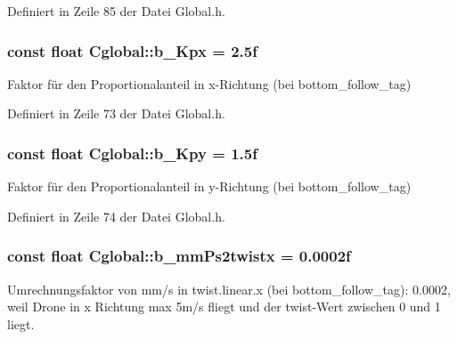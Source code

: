 Definiert in Zeile 85 der Datei Global.h.

\hypertarget{class_cglobal_ac4453024370993d15408d4a3235e95e8}{
\subsubsection[{b\_\-Kpx}]{\setlength{\rightskip}{0pt plus 5cm}const float {\bf Cglobal::b\_\-Kpx} = 2.5f}}
\label{class_cglobal_ac4453024370993d15408d4a3235e95e8}


Faktor für den Proportionalanteil in x-\/Richtung (bei bottom\_\-follow\_\-tag) 



Definiert in Zeile 73 der Datei Global.h.

\hypertarget{class_cglobal_aecfc05f716f9c1445fd10ad436972a9d}{
\subsubsection[{b\_\-Kpy}]{\setlength{\rightskip}{0pt plus 5cm}const float {\bf Cglobal::b\_\-Kpy} = 1.5f}}
\label{class_cglobal_aecfc05f716f9c1445fd10ad436972a9d}


Faktor für den Proportionalanteil in y-\/Richtung (bei bottom\_\-follow\_\-tag) 



Definiert in Zeile 74 der Datei Global.h.

\hypertarget{class_cglobal_ab0b5362dfd6addba8455bd753aa18e37}{
\subsubsection[{b\_\-mmPs2twistx}]{\setlength{\rightskip}{0pt plus 5cm}const float {\bf Cglobal::b\_\-mmPs2twistx} = 0.0002f}}
\label{class_cglobal_ab0b5362dfd6addba8455bd753aa18e37}


Umrechnungsfaktor von mm/s in twist.linear.x (bei bottom\_\-follow\_\-tag): 0.0002, weil Drone in x Richtung max 5m/s fliegt und der twist-\/Wert zwischen 0 und 1 liegt. 




